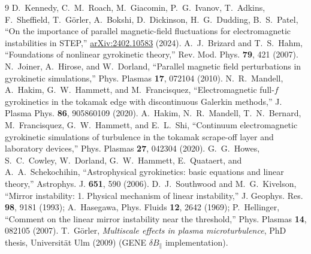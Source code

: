 \documentclass[11pt, letterpaper]{article}
\newcommand{\dBpar}{\delta B_\parallel}
\begin{document}
\begin{thebibliography}{9}
 D.~Kennedy, C.~M.~Roach, M.~Giacomin, P.~G.~Ivanov, T.~Adkins, F.~Sheffield,
  T.~G\"orler, A.~Bokshi, D.~Dickinson, H.~G.~Dudding, B.~S.~Patel,
  ``On the importance of parallel magnetic-field fluctuations for electromagnetic instabilities in STEP,''
  \href{https://arxiv.org/abs/2402.10583}{arXiv:2402.10583} (2024).
 A.~J.~Brizard and T.~S.~Hahm, ``Foundations of nonlinear gyrokinetic theory,''
  Rev. Mod. Phys. \textbf{79}, 421 (2007).
 N.~Joiner, A.~Hirose, and W.~Dorland, ``Parallel magnetic field perturbations in
  gyrokinetic simulations,'' Phys. Plasmas \textbf{17}, 072104 (2010).
 N.~R.~Mandell, A.~Hakim, G.~W.~Hammett, and M.~Francisquez,
  ``Electromagnetic full-$f$ gyrokinetics in the tokamak edge with discontinuous Galerkin methods,''
  J. Plasma Phys. \textbf{86}, 905860109 (2020).
 A.~Hakim, N.~R.~Mandell, T.~N.~Bernard, M.~Francisquez, G.~W.~Hammett, and E.~L.~Shi,
  ``Continuum electromagnetic gyrokinetic simulations of turbulence in the tokamak scrape-off layer
  and laboratory devices,'' Phys. Plasmas \textbf{27}, 042304 (2020).
 G.~G.~Howes, S.~C.~Cowley, W.~Dorland, G.~W.~Hammett, E.~Quataert, and A.~A.~Schekochihin,
  ``Astrophysical gyrokinetics: basic equations and linear theory,'' Astrophys. J. \textbf{651}, 590 (2006).
 D.~J.~Southwood and M.~G.~Kivelson, ``Mirror instability: 1. Physical mechanism of
  linear instability,'' J. Geophys. Res. \textbf{98}, 9181 (1993); A.~Hasegawa, Phys. Fluids \textbf{12}, 2642 (1969);
  P.~Hellinger, ``Comment on the linear mirror instability near the threshold,'' Phys. Plasmas \textbf{14}, 082105 (2007).
 T.~G\"orler, \emph{Multiscale effects in plasma microturbulence}, PhD thesis,
  Universit\"at Ulm (2009) (GENE $\dBpar$ implementation).
\end{thebibliography}
\end{document}
